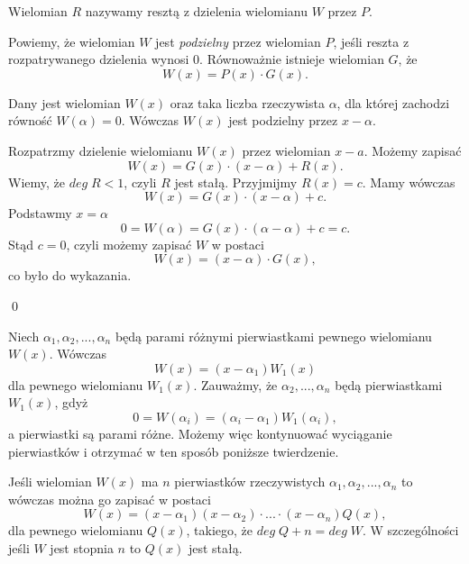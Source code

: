 \vspace{10px}



\noindent
Wielomian $R$ nazywamy resztą z dzielenia wielomianu $W$ przez $P$.

\vspace{10px}

\noindent
Powiemy, że wielomian $W$ jest \textit{podzielny} przez wielomian $P$, jeśli reszta z rozpatrywanego dzielenia wynosi $0$. Równoważnie istnieje wielomian $G$, że
\[
    W(x) = P(x) \cdot G(x).
\]

\vspace{10px}


\noindent
Dany jest wielomian $W(x)$ oraz taka liczba rzeczywista $\alpha$, dla której zachodzi równość $W(\alpha) = 0$. Wówczas $W(x)$ jest podzielny przez $x - \alpha$.

\newpage


\noindent
Rozpatrzmy dzielenie wielomianu $W(x)$ przez wielomian $x - a$. Możemy zapisać
\[
    W(x) = G(x) \cdot (x - \alpha) + R(x).
\]
Wiemy, że $deg \; R < 1$, czyli $R$ jest stałą. Przyjmijmy $R(x) = c$. Mamy wówczas
\[
    W(x) = G(x) \cdot (x - \alpha) + c.
\]
Podstawmy $x = \alpha$
\[
    0 = W(\alpha) = G(x) \cdot (\alpha - \alpha) + c = c.
\]
Stąd $c = 0$, czyli możemy zapisać $W$ w postaci
\[
    W(x) = (x - \alpha) \cdot G(x),
\]
co było do wykazania.

\qed

\vspace{5px}

\noindent
Niech $\alpha_1, \alpha_2, ..., \alpha_n$ będą parami różnymi pierwiastkami pewnego wielomianu $W(x)$. Wówczas 
\[
    W(x) = (x - \alpha_1)W_1(x)
\]
dla pewnego wielomianu $W_1(x)$. Zauważmy, że $\alpha_2, ..., \alpha_n$ będą pierwiastkami $W_1(x)$, gdyż
\[
    0 = W(\alpha_i) = (\alpha_i - \alpha_1)W_1(\alpha_i),
\]
a pierwiastki są parami różne. Możemy więc kontynuować wyciąganie pierwiastków i otrzymać w ten sposób poniższe twierdzenie.

\vspace{5px}


\noindent
Jeśli wielomian $W(x)$ ma $n$ pierwiastków rzeczywistych $\alpha_1, \alpha_2, ..., \alpha_n$ to wówczas można go zapisać w postaci
\[
    W(x) = (x - \alpha_1)(x - \alpha_2) \cdot ... \cdot (x - \alpha_n) Q(x),
\]
dla pewnego wielomianu $Q(x)$, takiego, że $deg\; Q + n = deg\; W$. W szczególności jeśli $W$ jest stopnia $n$ to $Q(x)$ jest stałą.

